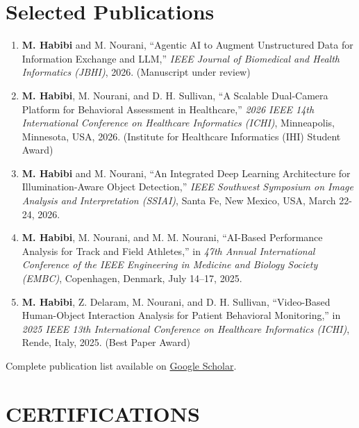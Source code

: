 \documentclass[10pt,a4paper,sans]{moderncv}
\begin{document}
\section{Selected Publications}
\begin{enumerate}

    \item \textbf{M. Habibi} and M. Nourani, ``Agentic AI to Augment Unstructured Data for Information Exchange and LLM,'' \textit{IEEE Journal of Biomedical and Health Informatics (JBHI)}, 2026. (Manuscript under review)

   \item \textbf{M. Habibi}, M. Nourani, and D. H. Sullivan, ``A Scalable Dual-Camera Platform for Behavioral Assessment in Healthcare,'' \textit{2026 IEEE 14th International Conference on Healthcare Informatics (ICHI)}, Minneapolis, Minnesota, USA, 2026. (Institute for Healthcare Informatics (IHI) Student Award)
   
    \item \textbf{M. Habibi} and M. Nourani, ``An Integrated Deep Learning Architecture for Illumination-Aware Object Detection,'' \textit{IEEE Southwest Symposium on Image Analysis and Interpretation (SSIAI)}, Santa Fe, New Mexico, USA, March 22-24, 2026.

    \item \textbf{M. Habibi}, M. Nourani, and M. M. Nourani, ``AI-Based Performance Analysis for Track and Field Athletes,'' in \textit{47th Annual International Conference of the IEEE Engineering in Medicine and Biology Society (EMBC)}, Copenhagen, Denmark, July 14--17, 2025.

    \item \textbf{M. Habibi}, Z. Delaram, M. Nourani, and D. H. Sullivan, ``Video-Based Human-Object Interaction Analysis for Patient Behavioral Monitoring,'' in \textit{2025 IEEE 13th International Conference on Healthcare Informatics (ICHI)}, Rende, Italy, 2025. (Best Paper Award)
\end{enumerate}
\vspace*{-3mm}
Complete publication list available on \href{https://scholar.google.com/citations?user=dHXIkhMAAAAJ&hl=en}{\color{blue} Google Scholar}.
\vspace*{-3mm}
\section{CERTIFICATIONS}
\end{document}
